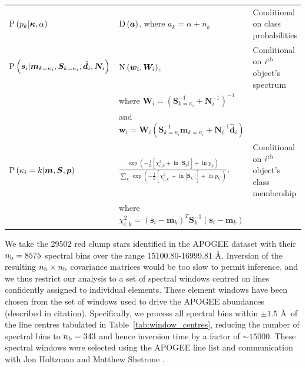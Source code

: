\documentclass[a4paper,fleqn,usenatbib]{mnras}
\newcommand{\nb}{n_{\rm b}}
\newcommand{\prob}{{\rm P}}
\newcommand{\normal}{{\rm{N}}}
\newcommand{\dirichlet}{{\rm D}}
\newcommand{\alphas}{{\bm a}}
\newcommand{\specmean}{{\bm m}}
\newcommand{\speccov}{{\bm S}}
\newcommand{\classprob}{{p}}
\newcommand{\classprobs}{{\bm p}}
\newcommand{\objspec}{{\bm s}}
\newcommand{\objclass}{{\kappa}}
\newcommand{\objclasses}{{\bm \kappa}}
\newcommand{\objdata}{\hat{\bm d}}
\newcommand{\objnoise}{{\bm N}}
\newcommand{\wfmean}{{\bm w}}
\newcommand{\wfcov}{{\bm W}}
\begin{document}
\begin{table}
\begin{tabular}{lll}
        $\prob\left(\classprob_k | \objclasses, \alpha\right)$ & $\dirichlet\left(\alphas\right)$, where $a_k = \alpha + n_k$ & Conditional on class probabilities \\
        $\prob \left( \objspec_i | \specmean_{k=\objclass_i}, \speccov_{k=\objclass_i}, \objdata_i, \objnoise_i \right)$ & $\normal \left( \wfmean_i, \wfcov_i \right)$, & Conditional on $i^{\rm th}$ object's spectrum \\
         & where $\wfcov_i = \left( \speccov_{k=\objclass_i}^{-1} + \objnoise_i^{-1} \right)^{-1}$ &  \\
         & and $\wfmean_i = \wfcov_i \left( \speccov_{k=\objclass_i}^{-1} \specmean_{k=\objclass_i} + \objnoise_i^{-1} \objdata_i \right)$ &  \\
        $\prob \left( \objclass_i = k | \specmean, \speccov, \classprobs \right)$ & $ \frac{ \exp \left( -\frac{1}{2} \left[ \chi^2_{i,k} + \ln \left| \speccov_k \right| \right] + \ln \classprob_k \right) }{ \sum_{k^\prime} \exp \left( -\frac{1}{2} \left[ \chi^2_{i,k^\prime} + \ln \left| \speccov_{k^\prime} \right| \right] + \ln \classprob_{k^\prime} \right) }$, & Conditional on $i^{\rm th}$ object's class membership \\
         & where $\chi^2_{i,k} = \left( \objspec_i - \specmean_k \right)^T \speccov_k^{-1} \left( \objspec_i - \specmean_k \right) $ &  \\
        \hline
    \end{tabular}
\end{table}


We take the 29502 red clump stars identified in the APOGEE dataset with their $\nb = 8575$ spectral bins over the range 15100.80-16999.81 \AA. Inversion of the resulting $\nb \times \nb$ covariance matrices would be too slow to permit inference, and we thus restrict our analysis to a set of spectral windows centred on lines confidently assigned to individual elements. These element windows have been chosen from the set of windows used to drive the APOGEE abundances (described in citation). Specifically, we process all spectral bins within $\pm 1.5$ \AA\ of the line centres tabulated in Table~\ref{tab:window_centres}, reducing the number of spectral bins to $\nb = 343$ and hence inversion time by a factor of $\sim15000$. These spectral windows were selected using the APOGEE line list and communication with Jon Holtzman and Matthew Shetrone \citep{Holtz2015}. 
\end{document}
